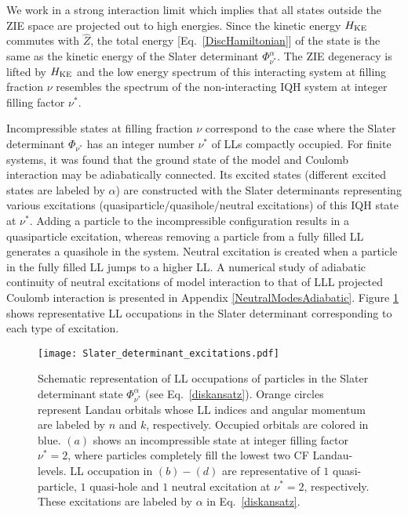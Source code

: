 \documentclass[prb,aps,epsfig,longbibliography,twocolumn]{revtex4-1}
\begin{document}
We work in a strong interaction limit which implies that all states outside the ZIE space are projected out to high energies. Since the kinetic energy $H_{\rm KE}$ commutes with $\hat{Z}$, the total energy [Eq.~\ref{DiscHamiltonian}] of the state is the same as the kinetic energy of the Slater determinant $\Phi^{\alpha}_{\nu^*} $. The ZIE degeneracy is lifted by $H_{\rm KE}$ and the low energy spectrum of this interacting system at filling fraction $\nu$ resembles the spectrum of the non-interacting IQH system at integer filling factor $\nu^*$.

Incompressible states at filling fraction $\nu$ correspond to the case where the Slater determinant $\Phi_{\nu^*}$ has an integer number $\nu^*$ of LLs compactly occupied. For finite systems, it was found that the ground state of the model and Coulomb interaction may be adiabatically connected. Its excited states (different excited states are labeled by $\alpha$) are constructed with the Slater determinants representing various excitations (quasiparticle/quasihole/neutral excitations) of this IQH state at $\nu^*$. Adding a particle to the incompressible configuration results in a quasiparticle excitation, whereas removing a particle from a fully filled LL generates a quasihole in the system. Neutral excitation is created when a particle in the fully filled LL jumps to a higher LL. A numerical study of adiabatic continuity of neutral excitations of model interaction to that of LLL projected Coulomb interaction is presented in Appendix \ref{NeutralModesAdiabatic}.  Figure \ref{fig:SlaterSchematic} shows representative LL occupations in the Slater determinant corresponding to each type of excitation.  

\begin{figure}[h]
	\texttt{[image: Slater\_determinant\_excitations.pdf]}
	\caption{ Schematic representation of LL occupations of particles in the Slater determinant state $\Phi_{\nu^*}^{\alpha}$ (see Eq.~\ref{diskansatz}). Orange circles represent Landau orbitals whose LL indices and angular momentum are labeled by $n$ and $k$, respectively. Occupied orbitals are colored in blue.  $(a)$ shows an incompressible state at integer filling factor $\nu^*=2$, where particles completely fill the lowest two CF Landau-levels. LL occupation in $(b)-(d)$ are representative of $1$ quasi-particle, $1$ quasi-hole and $1$ neutral excitation at $\nu^*=2$, respectively. These excitations are labeled by $\alpha$ in Eq.~\eqref{diskansatz}.
	}
	\label{fig:SlaterSchematic}
\end{figure} 
\end{document}
